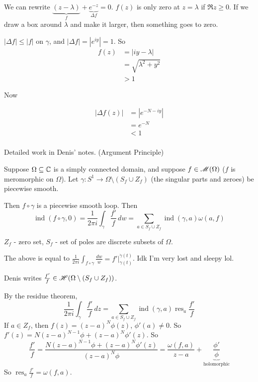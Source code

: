 \documentclass[x11names,reqno,14pt]{extarticle}
\DeclareMathOperator{\ind}{ind}
\DeclareMathOperator{\res}{res}
\begin{document}
We can rewrite $\underbrace{(z - \lambda)}_{f} + \underbrace{e^{-z}}_{\Delta f} = 0$. $f(z)$ is only zero at $z = \lambda$ if $\Re z \geq 0$. If we draw a box around $\lambda$ and make it larger, then something goes to zero. 

$|\Delta f| \leq |f|$ on $\gamma$, and $|\Delta f| = |e^{iy}| = 1$. So
\begin{align*}
f(z) & = |iy - \lambda| \\
& = \sqrt{\lambda^2 + y^2} \\
& > 1
\end{align*}

Now

\begin{align*}
|\Delta f(z)| & = |e^{-N - iy}| \\ & = e^{-N} \\ & < 1 \\ 
\end{align*}

Detailed work in Denis' notes. 
\thm (Argument Principle)

Suppose $\Omega\subseteq\mathbb{C}$ is a simply connected domain, and suppose $f \in \mathscr{M}(\Omega)$ ($f$ is meromorphic on $\Omega$). Let $\gamma:S^1\to\Omega\setminus(S_f \cup Z_f)$ (the singular parts and zeroes) be piecewise smooth. 

Then $f \circ \gamma$ is a piecewise smooth loop. Then 
\[
\ind(f\circ\gamma , 0) = \frac{1}{2\pi i}\int_{\gamma}\frac{f'}{f}\,dw = \sum_{a \in S_f \cup Z_f} \ind(\gamma, a) \omega(a, f)
\]

\rem

$Z_f$ - zero set, $S_f$ - set of poles are discrete subsets of $\Omega$. 

\proof

The above is equal to $\frac{1}{2\pi i}\int_{f\circ \gamma}\frac{dw}{w}  = f'|_{\gamma(t)}^{\dot{\gamma}(t)}$. Idk I'm very lost and sleepy lol. 

Denis writes $\frac{f'}{f} \in \mathscr{H}(\Omega\setminus(S_f \cup Z_f))$.

By the residue theorem, 
\[
\frac{1}{2\pi i}\int_{\gamma}\frac{f'}{f}\,dz = \sum_{a\in S_f \cup Z_f}\ind(\gamma, a)\res_a\frac{f'}{f}
\]
If $a \in Z_f$, then $f(z) = (z - a)^N\phi(z)$, $\phi'(a)\neq0$. So $f'(z) = N(z - a)^{N - 1}\phi + (z - a)^N\phi'(z)$. So
\[
\frac{f'}{f} = \frac{N(z - a)^{N - 1}\phi + (z - a)^N\phi'(z)}{(z - a)^N\phi} = \frac{\omega(f, a)}{z - a} + \underbrace{\frac{\phi'}{\phi}}_{\text{holomorphic}}
\]
So $\res_a\frac{f'}{f} = \omega(f, a)$. 
\end{document}

